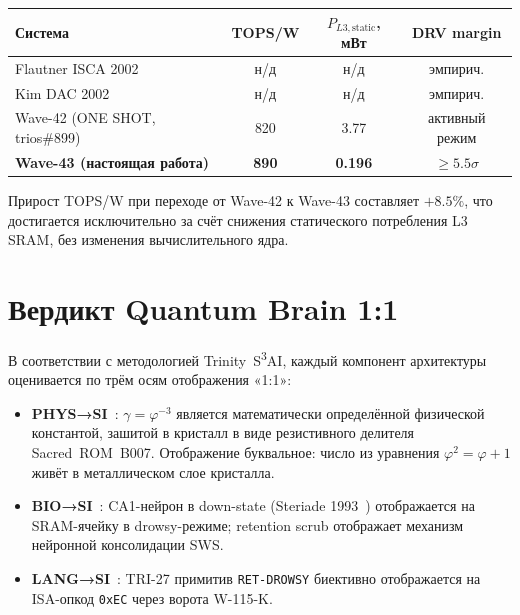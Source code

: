 \begin{center}
\begin{tabular}{|l|c|c|c|}
  \hline
  \textbf{Система} & \textbf{TOPS/W} & \textbf{$P_{L3,\text{static}}$, мВт} & \textbf{DRV margin} \\
  \hline
  Flautner ISCA 2002~\cite{FlautnerISCA2002} & н/д & н/д & эмпирич. \\
  Kim DAC 2002~\cite{KimDAC2002}          & н/д & н/д & эмпирич. \\
  Wave-42 (ONE SHOT, trios\#899)~\cite{trios899} & 820 & 3.77 & активный режим \\
  \textbf{Wave-43 (настоящая работа)}     & \textbf{890} & \textbf{0.196} & \textbf{$\geq 5.5\sigma$} \\
  \hline
\end{tabular}
\end{center}

\vspace{0.5em}
Прирост TOPS/W при переходе от Wave-42 к Wave-43 составляет $+8.5\%$,
что достигается исключительно за счёт снижения статического потребления L3 SRAM,
без изменения вычислительного ядра.

\section{Вердикт Quantum Brain 1:1}
\label{sec:glava89-qb}

В соответствии с методологией Trinity~S\textsuperscript{3}AI,
каждый компонент архитектуры оценивается по трём осям
отображения «1:1»:
%
\begin{itemize}
  \item \textbf{PHYS→SI}~\checkmark:
        $\gamma = \varphi^{-3}$ является математически определённой
        физической константой, зашитой в кристалл в виде
        резистивного делителя Sacred~ROM~B007.
        Отображение буквальное: число из уравнения $\varphi^2 = \varphi + 1$
        живёт в металлическом слое кристалла.
  \item \textbf{BIO→SI}~\checkmark:
        CA1-нейрон в down-state (Steriade 1993~\cite{SteriadeCA1Slow1993})
        отображается на SRAM-ячейку в drowsy-режиме;
        retention scrub отображает механизм нейронной консолидации SWS.
  \item \textbf{LANG→SI}~\checkmark:
        TRI-27 примитив \texttt{RET-DROWSY} биективно отображается
        на ISA-опкод \texttt{0xEC} через ворота W-115-K.
\end{itemize}

